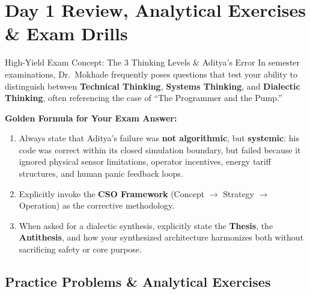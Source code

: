 \section{Day 1 Review, Analytical Exercises \& Exam Drills}
\label{sec:day1_exercises}

\begin{examprepbox}{High-Yield Exam Concept: The 3 Thinking Levels \& Aditya's Error}
In semester examinations, Dr.~Mokhade frequently poses questions that test your ability to distinguish between \textbf{Technical Thinking}, \textbf{Systems Thinking}, and \textbf{Dialectic Thinking}, often referencing the case of ``The Programmer and the Pump.'' 

\textbf{Golden Formula for Your Exam Answer:}
\begin{enumerate}[leftmargin=1.5em]
    \item Always state that Aditya's failure was \textbf{not algorithmic}, but \textbf{systemic}: his code was correct within its closed simulation boundary, but failed because it ignored physical sensor limitations, operator incentives, energy tariff structures, and human panic feedback loops.
    \item Explicitly invoke the \textbf{CSO Framework} (Concept $\to$ Strategy $\to$ Operation) as the corrective methodology.
    \item When asked for a dialectic synthesis, explicitly state the \textbf{Thesis}, the \textbf{Antithesis}, and how your synthesized architecture harmonizes both without sacrificing safety or core purpose.
\end{enumerate}
\end{examprepbox}

\subsection{Practice Problems \& Analytical Exercises}

